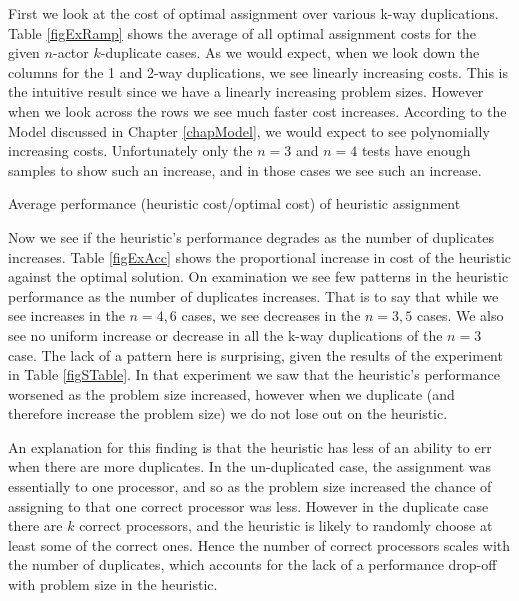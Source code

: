 First we look at the cost of optimal assignment over various k-way duplications.
Table \ref{figExRamp} shows the average of all optimal assignment costs for the given $n$-actor $k$-duplicate cases.
As we would expect, when we look down the columns for the 1 and 2-way duplications, we see linearly increasing costs.
This is the intuitive result since we have a linearly increasing problem sizes.
However when we look across the rows we see much faster cost increases.
According to the Model discussed in Chapter \ref{chapModel}, we would expect to see polynomially increasing costs.
Unfortunately only the $n = 3$ and $n = 4$ tests have enough samples to show such an increase, and in those cases we see such an increase.

\begin{table}
\begin{center}
	
\caption{Average performance (heuristic cost/optimal cost) of heuristic assignment}
\label{figExAcc}
\end{center}
\end{table}

Now we see if the heuristic's performance degrades as the number of duplicates increases.
Table \ref{figExAcc} shows the proportional increase in cost of the heuristic against the optimal solution.
On examination we see few patterns in the heuristic performance as the number of duplicates increases.
That is to say that while we see increases in the $n=4, 6$ cases, we see decreases in the $n=3, 5$ cases.
We also see no uniform increase or decrease in all the k-way duplications of the $n=3$ case.
The lack of a pattern here is surprising, given the results of the experiment in Table \ref{figSTable}.
In that experiment we saw that the heuristic's performance worsened as the problem size increased, however when we duplicate (and therefore increase the problem size) we do not lose out on the heuristic.

An explanation for this finding is that the heuristic has less of an ability to err when there are more duplicates.
In the un-duplicated case, the assignment was essentially to one processor, and so as the problem size increased the chance of assigning to that one correct processor was less.
However in the duplicate case there are $k$ correct processors, and the heuristic is likely to randomly choose at least some of the correct ones.
Hence the number of correct processors scales with the number of duplicates, which accounts for the lack of a performance drop-off with problem size in the heuristic.

